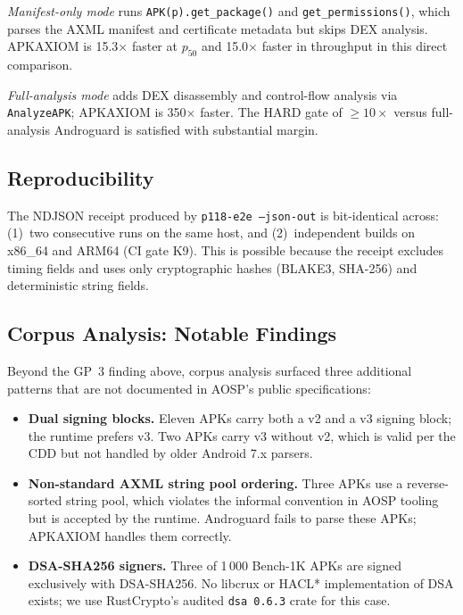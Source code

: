 \documentclass[runningheads]{llncs}
\begin{document}
\emph{Manifest-only mode} runs \texttt{APK(p).get\_package()} and
\texttt{get\_permissions()}, which parses the AXML manifest and certificate
metadata but skips DEX analysis.  APKAXIOM is 15.3$\times$ faster at $p_{50}$
and 15.0$\times$ faster in throughput in this direct comparison.

\emph{Full-analysis mode} adds DEX disassembly and control-flow analysis via
\texttt{AnalyzeAPK}; APKAXIOM is 350$\times$ faster.  The HARD gate of
$\geq 10\times$ versus full-analysis Androguard is satisfied with substantial
margin.

\subsection{Reproducibility}

The NDJSON receipt produced by \texttt{p118-e2e --json-out} is
bit-identical across: (1)~two consecutive runs on the same host, and
(2)~independent builds on x86\_64 and ARM64 (CI gate K9).  This is possible
because the receipt excludes timing fields and uses only cryptographic hashes
(BLAKE3, SHA-256) and deterministic string fields.

\subsection{Corpus Analysis: Notable Findings}

Beyond the GP~3 finding above, corpus analysis surfaced three additional
patterns that are not documented in AOSP's public specifications:

\begin{itemize}
\item \textbf{Dual signing blocks.}  Eleven APKs carry both a v2 and a v3
  signing block; the runtime prefers v3.  Two APKs carry v3 without v2,
  which is valid per the CDD but not handled by older Android 7.x parsers.

\item \textbf{Non-standard AXML string pool ordering.}  Three APKs use a
  reverse-sorted string pool, which violates the informal convention in AOSP
  tooling but is accepted by the runtime.  Androguard fails to parse these
  APKs; APKAXIOM handles them correctly.

\item \textbf{DSA-SHA256 signers.}  Three of 1\,000 Bench-1K APKs are signed
  exclusively with DSA-SHA256.  No libcrux or HACL* implementation of DSA
  exists; we use RustCrypto's audited \texttt{dsa~0.6.3} crate for this case.
\end{itemize}
\end{document}

